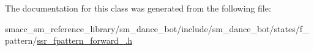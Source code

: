 The documentation for this class was generated from the following file\+:\begin{DoxyCompactItemize}
\item 
smacc\+\_\+sm\+\_\+reference\+\_\+library/sm\+\_\+dance\+\_\+bot/include/sm\+\_\+dance\+\_\+bot/states/f\+\_\+pattern/\hyperlink{ssr__fpattern__forward__2_8h}{ssr\+\_\+fpattern\+\_\+forward\+\_.\+h}\end{DoxyCompactItemize}
